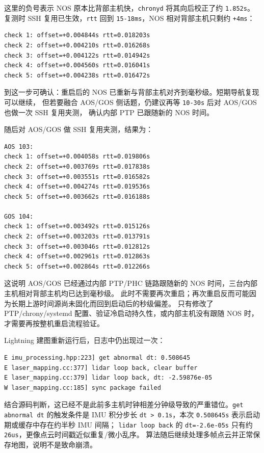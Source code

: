\documentclass[UTF8,11pt,a4paper]{ctexart}
\begin{document}
这里的负号表示 NOS 原本比背部主机快，\texttt{chronyd} 将其向后校正了约 \texttt{1.852s}。
复测时 SSH 复用已生效，\texttt{rtt} 回到 \texttt{15-18ms}，NOS 相对背部主机只剩约 \texttt{+4ms}：

\begin{verbatim}
check 1: offset=+0.004844s rtt=0.018203s
check 2: offset=+0.004210s rtt=0.016268s
check 3: offset=+0.004122s rtt=0.014942s
check 4: offset=+0.004560s rtt=0.016041s
check 5: offset=+0.004238s rtt=0.016472s
\end{verbatim}

到这一步可确认：重启后的 NOS 已重新与背部主机对齐到毫秒级。短期导航复现可以继续，
但若要融合 AOS/GOS 侧话题，仍建议再等 \texttt{10-30s} 后对 AOS/GOS 也做一次 SSH 复用夹测，
确认内部 PTP 已跟随新的 NOS 时间。

随后对 AOS/GOS 做 SSH 复用夹测，结果为：

\begin{verbatim}
AOS 103:
check 1: offset=+0.004058s rtt=0.019806s
check 2: offset=+0.003769s rtt=0.017838s
check 3: offset=+0.003551s rtt=0.016582s
check 4: offset=+0.004274s rtt=0.019536s
check 5: offset=+0.003662s rtt=0.016188s

GOS 104:
check 1: offset=+0.003492s rtt=0.015126s
check 2: offset=+0.003203s rtt=0.013791s
check 3: offset=+0.003046s rtt=0.012812s
check 4: offset=+0.002961s rtt=0.012863s
check 5: offset=+0.002864s rtt=0.012266s
\end{verbatim}

这说明 AOS/GOS 已经通过内部 PTP/PHC 链路跟随新的 NOS 时间，三台内部主机相对背部主机均已达到毫秒级。
此时不需要再次重启；再次重启反而可能因为长期上游时间源尚未固化而回到启动后的秒级偏差。
只有修改了 PTP/chrony/systemd 配置、验证冷启动持久性，或内部主机没有跟随 NOS 时，才需要再按整机重启流程验证。

Lightning 建图重新运行后，日志中仍出现过一次：

\begin{verbatim}
E imu_processing.hpp:223] get abnormal dt: 0.508645
E laser_mapping.cc:377] lidar loop back, clear buffer
E laser_mapping.cc:379] lidar loop back, dt: -2.59876e-05
W laser_mapping.cc:185] sync package failed
\end{verbatim}

结合源码判断，这已经不是此前多主机时钟相差分钟级导致的严重错位。\texttt{get abnormal dt} 的触发条件是
IMU 积分步长 \texttt{dt > 0.1s}，本次 \texttt{0.508645s} 表示启动期或缓存中存在约半秒 IMU 间隔；
\texttt{lidar loop back} 的 \texttt{dt=-2.6e-05s} 只有约 \texttt{26us}，更像点云时间戳近似重复/微小乱序。
算法随后继续处理多帧点云并正常保存地图，说明不是致命崩溃。
\end{document}

